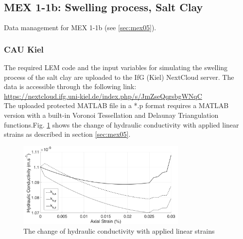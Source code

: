 \subsection{MEX 1-1b: Swelling process, Salt Clay}

Data management for MEX 1-1b (see \ref{sec:mex05}).

\subsubsection*{CAU Kiel}
The required LEM code and the input variables for simulating the swelling process of the salt clay are uploaded to the IfG (Kiel) NextCloud server. The data is accessible through the following link:\\
\hyperlink{https://nextcloud.ifg.uni-kiel.de/index.php/s/JmZseQqrsbgWNqC}{https://nextcloud.ifg.uni-kiel.de/index.php/s/JmZseQqrsbgWNqC}\\

The uploaded protected MATLAB file in a *.p format requires a MATLAB version with a built-in Voronoi Tessellation and Delaunay Triangulation functions.Fig. \ref{fig:Amir_ME5_Lattice_Drying_Data} shows the change of hydraulic conductivity with applied linear strains as described in section \ref {sec:mex05}. 

\begin{figure}[!ht]
\centering
\includegraphics[width=0.75\textwidth]{figures/Amir_ME5_Lattice_Drying_Data.png}
\caption{The change of hydraulic conductivity with applied linear strains}
\label{fig:Amir_ME5_Lattice_Drying_Data}
\end{figure}

